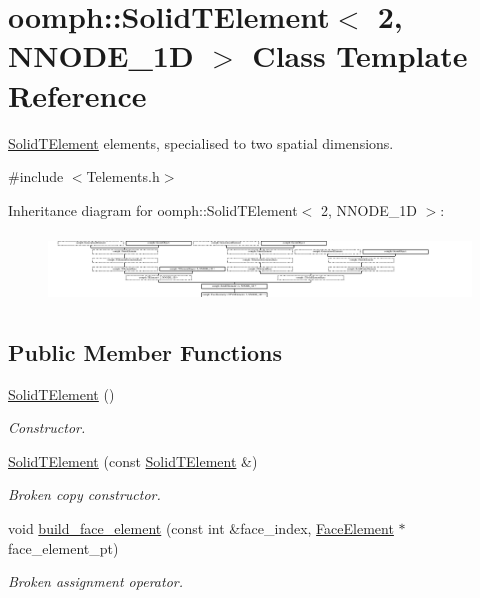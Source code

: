 \hypertarget{classoomph_1_1SolidTElement_3_012_00_01NNODE__1D_01_4}{}\section{oomph\+:\+:Solid\+T\+Element$<$ 2, N\+N\+O\+D\+E\+\_\+1D $>$ Class Template Reference}
\label{classoomph_1_1SolidTElement_3_012_00_01NNODE__1D_01_4}


\hyperlink{classoomph_1_1SolidTElement}{Solid\+T\+Element} elements, specialised to two spatial dimensions.  




{\ttfamily \#include $<$Telements.\+h$>$}

Inheritance diagram for oomph\+:\+:Solid\+T\+Element$<$ 2, N\+N\+O\+D\+E\+\_\+1D $>$\+:\begin{figure}[H]
\begin{center}
\leavevmode
\includegraphics[height=1.840375cm]{classoomph_1_1SolidTElement_3_012_00_01NNODE__1D_01_4}
\end{center}
\end{figure}
\subsection*{Public Member Functions}
\begin{DoxyCompactItemize}
\item 
\hyperlink{classoomph_1_1SolidTElement_3_012_00_01NNODE__1D_01_4_a3ae7c8c0ccc5e31e86d5a354b8fa7052}{Solid\+T\+Element} ()
\begin{DoxyCompactList}\small\item\em Constructor. \end{DoxyCompactList}\item 
\hyperlink{classoomph_1_1SolidTElement_3_012_00_01NNODE__1D_01_4_a8fa51cd2f601cb630ebd6d064f0e51f3}{Solid\+T\+Element} (const \hyperlink{classoomph_1_1SolidTElement}{Solid\+T\+Element} \&)
\begin{DoxyCompactList}\small\item\em Broken copy constructor. \end{DoxyCompactList}\item 
void \hyperlink{classoomph_1_1SolidTElement_3_012_00_01NNODE__1D_01_4_a6357d971d1a29e15ec8fbd47c2945524}{build\+\_\+face\+\_\+element} (const int \&face\+\_\+index, \hyperlink{classoomph_1_1FaceElement}{Face\+Element} $\ast$face\+\_\+element\+\_\+pt)
\begin{DoxyCompactList}\small\item\em Broken assignment operator. \end{DoxyCompactList}\end{DoxyCompactItemize}
